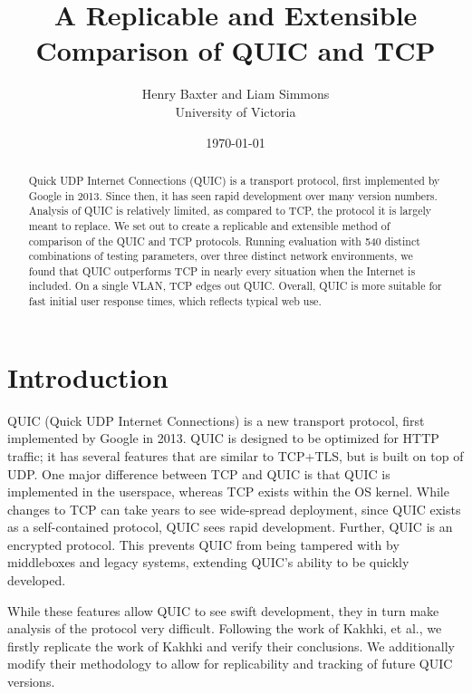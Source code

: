 \documentclass[12pt]{article}
\begin{document}
\title{A Replicable and Extensible Comparison of QUIC and TCP}
\author{Henry Baxter and Liam Simmons\\
		University of Victoria}
\date{\today}

\maketitle

\begin{abstract}
	Quick UDP Internet Connections (QUIC) is a transport protocol, first implemented by Google in 2013. Since then, it has seen rapid development over many version numbers. Analysis of QUIC is relatively limited, as compared to TCP, the protocol it is largely meant to replace. We set out to create a replicable and extensible method of comparison of the QUIC and TCP protocols. Running evaluation with 540 distinct combinations of testing parameters, over three distinct network environments, we found that QUIC outperforms TCP in nearly every situation when the Internet is included. On a single VLAN, TCP edges out QUIC. Overall, QUIC is more suitable for fast initial user response times, which reflects typical web use.
\end{abstract}

\section{Introduction}
\label{introduction}

QUIC (Quick UDP Internet Connections) is a new transport protocol, first implemented by Google in 2013. QUIC is designed to be optimized for HTTP traffic; it has several features that are similar to TCP+TLS, but is built on top of UDP. One major difference between TCP and QUIC is that QUIC is implemented in the userspace\cite{quicLayout}, whereas TCP exists within the OS kernel. While changes to TCP can take years to see wide-spread deployment, since QUIC exists as a self-contained protocol, QUIC sees rapid development. Further, QUIC is an encrypted protocol. This prevents QUIC from being tampered with by middleboxes and legacy systems, extending QUIC's ability to be quickly developed. 

While these features allow QUIC to see swift development, they in turn make analysis of the protocol very difficult. Following the work of Kakhki, et al.\cite{Kakhki:2017:TLL:3131365.3131368}, we firstly replicate the work of Kakhki and verify their conclusions. We additionally modify their methodology to allow for replicability and tracking of future QUIC versions.
\end{document}

